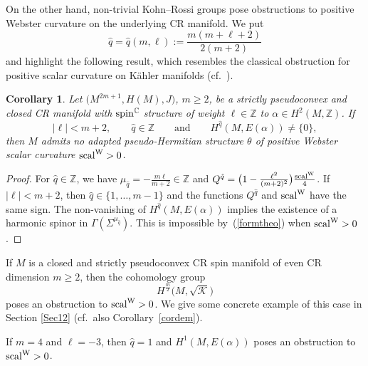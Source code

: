 \documentclass[pdftex]{sigma}
\numberwithin{equation}{section}
\newtheorem{Corollary}[Theorem]{Corollary}
\newcommand{\ZZ}{\mathbb{Z}}
\newcommand{\CC}{\mathbb{C}}
\begin{document}
On the other hand, non-trivial Kohn--Rossi groups pose obstructions to positive Webster curvature on the underlying CR manifold.
We put
\[
\hat{q}=\hat{q}(m,\ell) := \frac{m(m+\ell+2)}{2(m+2)}
\]
and highlight the following result, which resembles the classical obstruction for positive scalar curvature on K\"ahler manifolds
(cf.~\cite{Hitch, Lich}).

\begin{Corollary} \label{ObsKR} Let $\big(M^{2m+1}, H(M),J\big)$, $m\geq 2$, be a strictly pseudoconvex and closed CR manifold with ${\rm spin}^\CC$ structure
of weight $\ell\in\ZZ$ to $\alpha\in H^2(M,\ZZ)$. If
\[
|\ell|<m+2,\qquad \hat{q}\in\ZZ\qquad\mbox{and}\qquad H^{\hat{q}}(M,E(\alpha)) \neq \{0\},
\]
then $M$ admits no adapted pseudo-Hermitian structure $\theta$ of positive Webster scalar curvature ${\rm scal}^{\rm W}>0$.
\end{Corollary}

\begin{proof} For $\hat{q}\in\ZZ$, we have $\mu_{\hat{q}}=-\frac{m\ell}{m+2}\in\ZZ$ and $Q^{\hat{q}}=\big(1-\frac{\ell^2}{(m+2)^2}\big)\frac{{\rm scal}^{\rm W}}{4}$.
If $|\ell|<m+2$, then $\hat{q}\in\{1,\dots,m-1\}$ and the functions $Q^{\hat{q}}$ and ${\rm scal}^{\rm W}$ have the same sign.
The non-vanishing of $H^{\hat{q}}(M,E(\alpha))$ implies the existence of
a harmonic spinor in $\Gamma(\Sigma^{\mu_{\hat{q}}})$. This is impossible by~(\ref{formtheo}) when ${\rm scal}^{\rm W}>0$.
\end{proof}

\begin{Example} If $M$ is a closed and strictly pseudoconvex CR spin manifold of even CR dimension $m \geq 2$, then
the cohomology group
\[
H^{\frac{m}{2}}\big(M,\sqrt{\mathcal{K}}\big)
\]
poses an obstruction to ${\rm scal}^{\rm W}>0$. We give some concrete example of this case in Section \ref{Sec12} (cf.\ also Corollary~\ref{cordem}).
\end{Example}

\begin{Example} If $m=4$ and $\ell=-3$, then $\hat{q}=1$ and $H^1(M,E(\alpha))$ poses an obstruction to
${\rm scal}^{\rm W}>0$.
\end{Example}
\end{document}
